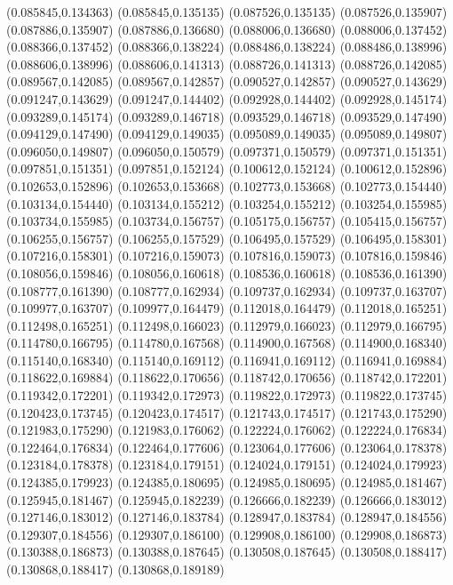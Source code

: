 (0.085845,0.134363)
(0.085845,0.135135)
(0.087526,0.135135)
(0.087526,0.135907)
(0.087886,0.135907)
(0.087886,0.136680)
(0.088006,0.136680)
(0.088006,0.137452)
(0.088366,0.137452)
(0.088366,0.138224)
(0.088486,0.138224)
(0.088486,0.138996)
(0.088606,0.138996)
(0.088606,0.141313)
(0.088726,0.141313)
(0.088726,0.142085)
(0.089567,0.142085)
(0.089567,0.142857)
(0.090527,0.142857)
(0.090527,0.143629)
(0.091247,0.143629)
(0.091247,0.144402)
(0.092928,0.144402)
(0.092928,0.145174)
(0.093289,0.145174)
(0.093289,0.146718)
(0.093529,0.146718)
(0.093529,0.147490)
(0.094129,0.147490)
(0.094129,0.149035)
(0.095089,0.149035)
(0.095089,0.149807)
(0.096050,0.149807)
(0.096050,0.150579)
(0.097371,0.150579)
(0.097371,0.151351)
(0.097851,0.151351)
(0.097851,0.152124)
(0.100612,0.152124)
(0.100612,0.152896)
(0.102653,0.152896)
(0.102653,0.153668)
(0.102773,0.153668)
(0.102773,0.154440)
(0.103134,0.154440)
(0.103134,0.155212)
(0.103254,0.155212)
(0.103254,0.155985)
(0.103734,0.155985)
(0.103734,0.156757)
(0.105175,0.156757)
(0.105415,0.156757)
(0.106255,0.156757)
(0.106255,0.157529)
(0.106495,0.157529)
(0.106495,0.158301)
(0.107216,0.158301)
(0.107216,0.159073)
(0.107816,0.159073)
(0.107816,0.159846)
(0.108056,0.159846)
(0.108056,0.160618)
(0.108536,0.160618)
(0.108536,0.161390)
(0.108777,0.161390)
(0.108777,0.162934)
(0.109737,0.162934)
(0.109737,0.163707)
(0.109977,0.163707)
(0.109977,0.164479)
(0.112018,0.164479)
(0.112018,0.165251)
(0.112498,0.165251)
(0.112498,0.166023)
(0.112979,0.166023)
(0.112979,0.166795)
(0.114780,0.166795)
(0.114780,0.167568)
(0.114900,0.167568)
(0.114900,0.168340)
(0.115140,0.168340)
(0.115140,0.169112)
(0.116941,0.169112)
(0.116941,0.169884)
(0.118622,0.169884)
(0.118622,0.170656)
(0.118742,0.170656)
(0.118742,0.172201)
(0.119342,0.172201)
(0.119342,0.172973)
(0.119822,0.172973)
(0.119822,0.173745)
(0.120423,0.173745)
(0.120423,0.174517)
(0.121743,0.174517)
(0.121743,0.175290)
(0.121983,0.175290)
(0.121983,0.176062)
(0.122224,0.176062)
(0.122224,0.176834)
(0.122464,0.176834)
(0.122464,0.177606)
(0.123064,0.177606)
(0.123064,0.178378)
(0.123184,0.178378)
(0.123184,0.179151)
(0.124024,0.179151)
(0.124024,0.179923)
(0.124385,0.179923)
(0.124385,0.180695)
(0.124985,0.180695)
(0.124985,0.181467)
(0.125945,0.181467)
(0.125945,0.182239)
(0.126666,0.182239)
(0.126666,0.183012)
(0.127146,0.183012)
(0.127146,0.183784)
(0.128947,0.183784)
(0.128947,0.184556)
(0.129307,0.184556)
(0.129307,0.186100)
(0.129908,0.186100)
(0.129908,0.186873)
(0.130388,0.186873)
(0.130388,0.187645)
(0.130508,0.187645)
(0.130508,0.188417)
(0.130868,0.188417)
(0.130868,0.189189)

